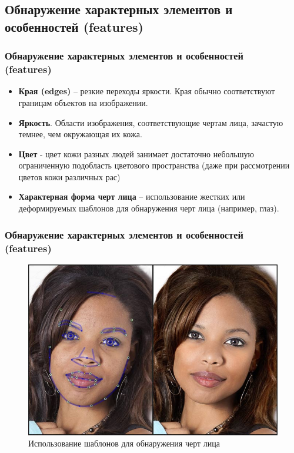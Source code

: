 \documentclass{beamer}
\begin{document}
\subsection{Обнаружение характерных элементов и особенностей (features)}

\begin{frame}
\frametitle{Обнаружение характерных элементов и особенностей\\(features)}

\begin{itemize}
    \item \textbf{Края (edges)} -- резкие переходы яркости. Края обычно соответствуют границам объектов на изображении.
    \item \textbf{Яркость}. Области изображения, соответствующие чертам лица, зачастую темнее, чем окружающая их кожа.
    \item \textbf{Цвет} - цвет кожи разных людей занимает достаточно небольшую ограниченную подобласть цветового пространства (даже при рассмотрении цветов кожи различных рас)
    \item \textbf{Характерная форма черт лица} -- использование жестких или деформируемых шаблонов для обнаружения черт лица (например, глаз). 
\end{itemize}

\end{frame}
\begin{frame}
\frametitle{Обнаружение характерных элементов и особенностей\\(features)}

\begin{figure}
\includegraphics[scale=0.35]{res/img02}
\caption{Использование шаблонов для обнаружения черт лица}
\end{figure}

\end{frame}
\end{document}
